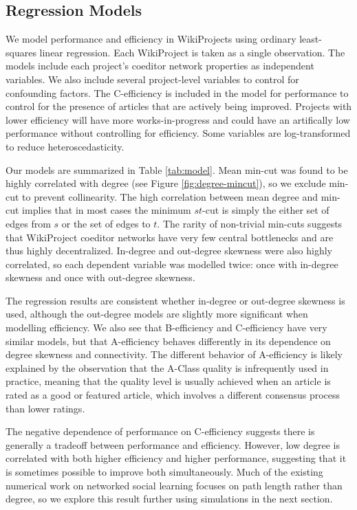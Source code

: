 \documentclass[10pt,twocolumn]{article}
\newcommand{\+}{\phantom{-}}
\begin{document}
\subsection{Regression Models}

We model performance and efficiency in WikiProjects using ordinary least-squares linear regression.
Each WikiProject is taken as a single observation.
The models include each project's coeditor network properties as independent variables.
We also include several project-level variables to control for confounding factors.
The C-efficiency is included in the model for performance to control for the presence of articles
that are actively being improved.
Projects with lower efficiency will have more works-in-progress and could have an artifically low
performance without controlling for efficiency.
Some variables are log-transformed to reduce heteroscedasticity.

Our models are summarized in Table \ref{tab:model}.
Mean min-cut was found to be highly correlated with degree (see Figure \ref{fig:degree-mincut}),
so we exclude min-cut to prevent collinearity.
The high correlation between mean degree and min-cut implies that in most cases
the minimum $st$-cut is simply the either set of edges from $s$ or the set of edges to $t$.
The rarity of non-trivial min-cuts suggests that WikiProject coeditor networks have very few central
bottlenecks and are thus highly decentralized.
In-degree and out-degree skewness were also highly correlated, so each dependent variable was modelled twice:
once with in-degree skewness and once with out-degree skewness.

The regression results are consistent whether in-degree or out-degree skewness is used,
although the out-degree models are slightly more significant when modelling efficiency.
We also see that B-efficiency and C-efficiency have very similar models, but that A-efficiency behaves
differently in its dependence on degree skewness and connectivity.
The different behavior of A-efficiency is likely explained by the observation that the A-Class quality is
infrequently used in practice, meaning that the quality level is usually achieved when an article is rated
as a good or featured article, which involves a different consensus process than lower ratings.

The negative dependence of performance on C-efficiency suggests there is generally a tradeoff between
performance and efficiency.
However, low degree is correlated with both higher efficiency and higher performance,
suggesting that it is sometimes possible to improve both simultaneously.
Much of the existing numerical work on networked social learning focuses on path length rather than degree,
so we explore this result further using simulations in the next section.
\end{document}
